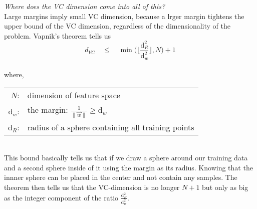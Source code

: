 \begin{frame}
            \textit{Where does the VC dimension come into all of this?}\\
            Large margins imply small VC dimension, because a lrger margin tightens the upper bound of the VC dimension, regardless of the dimensionality of the problem. Vapnik's theorem tells us\\
            $$
                d_{VC} \quad\leq\quad \min \bigg( \bigg\lfloor 
                \frac{\mathrm{d}_R^2}{\mathrm{d}_{{w}}^2}
            \bigg\rfloor, N \bigg) + 1
            $$\\
            where,\\
            \begin{tabular}{rl}
                $N$\;:& dimension of feature space \\[1mm]
                $\mathrm{d}_w$\;:& the margin: 
                    $\frac{1}{\|\vec w \|} \geq \mathrm{d}_w$ \\[1mm]
                $\mathrm{d}_R$\;:& radius of a sphere containing all training points
            \end{tabular}\\
            This bound basically tells us that if we draw a sphere around our training data and a second sphere inside of it using the margin as its radius. Knowing that the innner sphere can be placed in the center and not contain any samples. The theorem then tells us that the VC-dimension is no longer $N+1$ but only as big as the integer component of the ratio $\frac{\mathrm{d}_R^2}{\mathrm{d}_{{w}}^2}$.
            
\end{frame}
